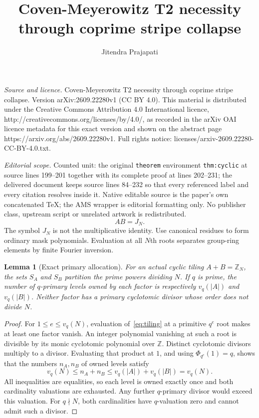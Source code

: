 \documentclass[10pt,a4paper]{amsart}
\newtheorem{lemma}[theorem]{Lemma}
\newcommand{\Z}{\mathbb Z}
\newcommand{\PhiC}{\Phi}
\begin{document}
\title[Coven-Meyerowitz T2 necessity through coprime stripe collaps]{Coven-Meyerowitz T2 necessity through coprime stripe collapse}
\author{Jitendra Prajapati}
\date{}
\maketitle
\noindent\emph{Source and licence.} Coven-Meyerowitz T2 necessity through coprime stripe collapse. Version arXiv:2609.22280v1 (CC BY 4.0). This material is distributed under the Creative Commons Attribution 4.0 International licence, http://creativecommons.org/licenses/by/4.0/, as recorded in the arXiv OAI licence metadata for this exact version and shown on the abstract page https://arxiv.org/abs/2609.22280v1. Full rights notice: licenses/arxiv-2609.22280-CC-BY-4.0.txt.\par\smallskip
\noindent\textit{Editorial scope.} Counted unit: the original \texttt{theorem} environment \texttt{thm:cyclic} at source lines 199--201 together with its complete proof at lines 202--231; the delivered document keeps source lines 84--232 so that every referenced label and every citation resolves inside it. Native editable source is the paper's own concatenated TeX; the AMS wrapper is editorial formatting only. No publisher class, upstream script or unrelated artwork is redistributed.
\begin{equation}\label{eq:tiling}
 AB=J_N.
\end{equation}
The symbol $J_N$ is not the multiplicative identity. Use canonical residues to form ordinary mask polynomials. Evaluation at all $N$th roots separates group-ring elements by finite Fourier inversion.

\begin{lemma}[Exact primary allocation]\label{lem:allocation}
For an actual cyclic tiling $A+B=\Z_N$, the sets $S_A$ and $S_B$ partition the prime powers dividing $N$. If $q$ is prime, the number of $q$-primary levels owned by each factor is respectively $v_q(|A|)$ and $v_q(|B|)$. Neither factor has a primary cyclotomic divisor whose order does not divide $N$.
\end{lemma}
\begin{proof}
For $1\le e\le v_q(N)$, evaluation of~\eqref{eq:tiling} at a primitive $q^e$ root makes at least one factor vanish. An integer polynomial vanishing at such a root is divisible by its monic cyclotomic polynomial over $\Z$. Distinct cyclotomic divisors multiply to a divisor. Evaluating that product at $1$, and using $\PhiC_{q^e}(1)=q$, shows that the numbers $n_A,n_B$ of owned levels satisfy
\[
 v_q(N)\le n_A+n_B\le v_q(|A|)+v_q(|B|)=v_q(N).
\]
All inequalities are equalities, so each level is owned exactly once and both cardinality valuations are exhausted. Any further $q$-primary divisor would exceed this valuation. For $q\nmid N$, both cardinalities have $q$-valuation zero and cannot admit such a divisor.
\end{proof}
\end{document}
